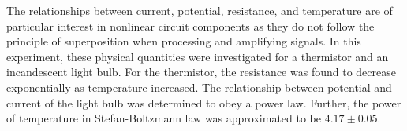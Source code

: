 
\physics

\begin{paperabs}
	
	
	The relationships between current, potential, resistance, and temperature are of particular interest in nonlinear circuit components as they do not follow the principle of superposition when processing and amplifying signals. In this experiment, these physical quantities were investigated for a thermistor and an incandescent light bulb. For the thermistor, the resistance was found to decrease exponentially as temperature increased. The relationship between potential and current of the light bulb was determined to obey a power law. Further, the power of temperature in Stefan-Boltzmann law was approximated to be \( 4.17 \pm 0.05 \). 
	
\end{paperabs}

